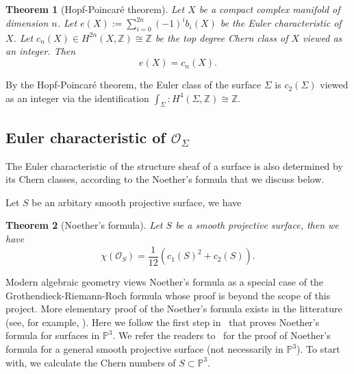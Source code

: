 \documentclass{article}
\newtheorem{theorem}{Theorem}[section]
\theoremstyle{definition}
\begin{document}
\begin{theorem}[Hopf-Poincaré theorem]
    Let $X$ be a compact complex manifold of dimension $n$. Let $e(X) := \sum_{i = 0}^{2n} (-1)^i b_i(X)$ be the Euler characteristic of $X$. Let $c_n(X)\in H^{2n}(X,\mathbb Z)\cong \mathbb Z$ be the top degree Chern class of $X$ viewed as an integer. Then 
    \[
    e(X) = c_n(X).
    \]
\end{theorem}
By the Hopf-Poincaré theorem, the Euler class of the surface $\Sigma$ is $c_2(\Sigma)$ viewed as an integer via the identification $\int_\Sigma: H^4(\Sigma, \mathbb Z)\cong \mathbb Z$.

\subsection{Euler characteristic of $\mathcal{O}_\Sigma$}
The Euler characteristic of the structure sheaf of a surface is also determined by its Chern classes, according to the Noether's formula that we discuss below.

Let $S$ be an arbitary smooth projective surface, we have
\begin{theorem}[Noether's formula]\label{ThmNoetherFormula}
    Let $S$ be a smooth projective surface, then we have 
    \[
    \chi(\mathcal O_S) = \frac{1}{12}(c_1(S)^2 + c_2(S)).
    \]
\end{theorem}

Modern algebraic geometry views Noether's formula as a special case of the Grothendieck-Riemann-Roch formula whose proof is beyond the scope of this project. More elementary proof of the Noether's formula exists in the litterature (see, for example, \cite[Section 4.6]{GriffithsHarris}). Here we follow the first step in~\cite[Section 4.6]{GriffithsHarris} that proves Noether's formula for surfaces in $\mathbb P^3$. We refer the readers to~\cite[Section 4.6]{GriffithsHarris} for the proof of Noether's formula for a general smooth projective surface (not necessarily in $\mathbb P^3$). To start with, we calculate the Chern numbers of $S\subset \mathbb P^3$.
\end{document}
